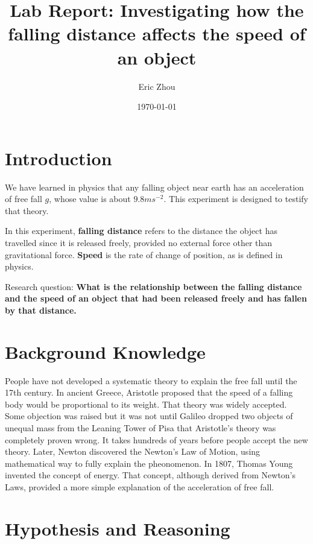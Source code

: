 \documentclass[a4paper]{article}
\begin{document}
\begin{titlepage}
    \title{\textbf{Lab Report: Investigating how the falling distance affects the speed of an object}}
    \author{Eric Zhou}
    \date{\today}
    \maketitle
    \tableofcontents
\end{titlepage}

\section{Introduction}

We have learned in physics that any falling object near earth has an acceleration of free fall $g$, whose value is about $9.8ms^{-2}$. This experiment is designed to testify that theory.

In this experiment, \textbf{falling distance} refers to the distance the object has travelled since it is released freely, provided no external force other than gravitational force. \textbf{Speed} is the rate of change of position, as is defined in physics.

Research question: \textbf{What is the relationship between the falling distance and the speed of an object that had been released freely and has fallen by that distance.}

\section{Background Knowledge}

People have not developed a systematic theory to explain the free fall until the 17th century. In ancient Greece, Aristotle proposed that the speed of a falling body would be proportional to its weight. That theory was widely accepted. Some objection was raised but it was not until Galileo dropped two objects of unequal mass from the Leaning Tower of Pisa that Aristotle's theory was completely proven wrong. It takes hundreds of years before people accept the new theory. Later, Newton discovered the Newton's Law of Motion, using mathematical way to fully explain the pheonomenon. In 1807, Thomas Young invented the concept of energy. That concept, although derived from Newton's Laws, provided a more simple explanation of the acceleration of free fall.

\section{Hypothesis and Reasoning}
\end{document}
